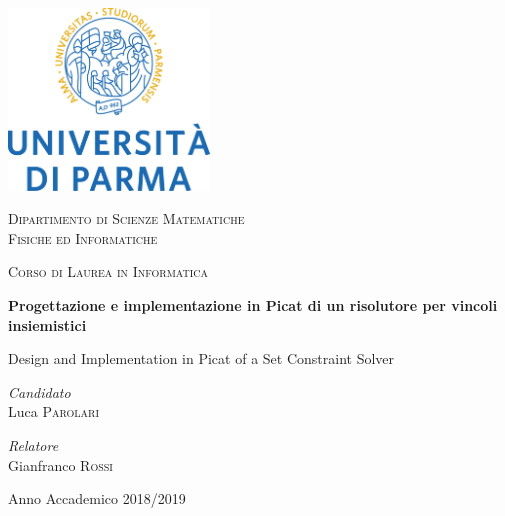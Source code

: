 \documentclass[12pt,a4paper,openright]{book} %
\begin{document}
\begin{titlepage}
    \begin{center}
        \includegraphics[width=0.4\textwidth]{img/logo_unipr.png}

		\vspace{0.5cm}

		\Large
        \textsc{Dipartimento di Scienze Matematiche\\
        Fisiche ed Informatiche}

        \vspace{0.5cm}

        \Large
        \textsc{Corso di Laurea in Informatica}

		\vspace{1.1cm}

        \Huge
        \textbf{Progettazione e implementazione in Picat di un
          risolutore per vincoli insiemistici}

        \vspace{1cm}
        \LARGE
        Design and Implementation in Picat of a Set Constraint Solver

		\vspace{1.3cm}


		\begin{minipage}{0.4\textwidth}
			\begin{flushleft}
				\large
				\textit{Candidato}\\
				Luca \textsc{Parolari}
			\end{flushleft}
		\end{minipage}
		\begin{minipage}{0.4\textwidth}
			\begin{flushright}
				\large
				\textit{Relatore}\\
				Gianfranco \textsc{Rossi}
			\end{flushright}
		\end{minipage}

        \vfill

 		\large
        Anno Accademico 2018/2019

    \end{center}
\end{titlepage}
\end{document}
